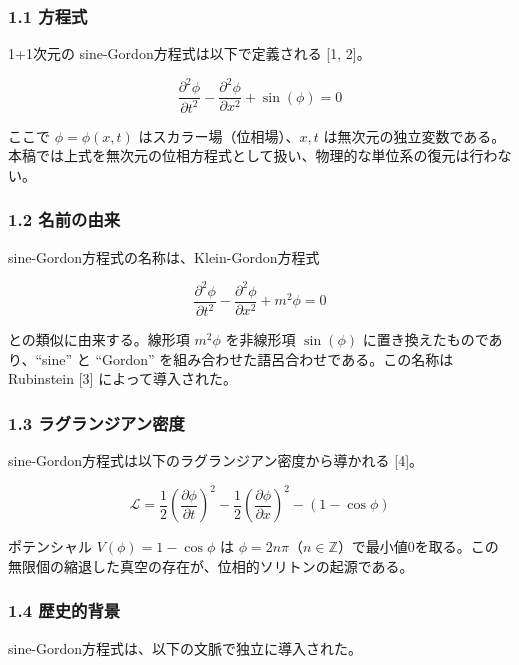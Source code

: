 \documentclass[a4paper,11pt]{ltjsarticle}
\begin{document}
\subsubsection{1.1 方程式}\label{ux65b9ux7a0bux5f0f}

1+1次元の sine-Gordon方程式は以下で定義される {[}1, 2{]}。

\[\frac{\partial^2 \phi}{\partial t^2} - \frac{\partial^2 \phi}{\partial x^2} + \sin(\phi) = 0\]

ここで \(\phi = \phi(x, t)\) はスカラー場（位相場）、\(x, t\)
は無次元の独立変数である。本稿では上式を無次元の位相方程式として扱い、物理的な単位系の復元は行わない。

\subsubsection{1.2 名前の由来}\label{ux540dux524dux306eux7531ux6765}

sine-Gordon方程式の名称は、Klein-Gordon方程式

\[\frac{\partial^2 \phi}{\partial t^2} - \frac{\partial^2 \phi}{\partial x^2} + m^2 \phi = 0\]

との類似に由来する。線形項 \(m^2 \phi\) を非線形項 \(\sin(\phi)\)
に置き換えたものであり、``sine'' と ``Gordon''
を組み合わせた語呂合わせである。この名称は Rubinstein {[}3{]}
によって導入された。

\subsubsection{1.3
ラグランジアン密度}\label{ux30e9ux30b0ux30e9ux30f3ux30b8ux30a2ux30f3ux5bc6ux5ea6}

sine-Gordon方程式は以下のラグランジアン密度から導かれる {[}4{]}。

\[\mathcal{L} = \frac{1}{2}\left(\frac{\partial \phi}{\partial t}\right)^2 - \frac{1}{2}\left(\frac{\partial \phi}{\partial x}\right)^2 - (1 - \cos\phi)\]

ポテンシャル \(V(\phi) = 1 - \cos\phi\) は
\(\phi = 2n\pi\)（\(n \in \mathbb{Z}\)）で最小値0を取る。この無限個の縮退した真空の存在が、位相的ソリトンの起源である。

\subsubsection{1.4 歴史的背景}\label{ux6b74ux53f2ux7684ux80ccux666f}

sine-Gordon方程式は、以下の文脈で独立に導入された。
\end{document}
